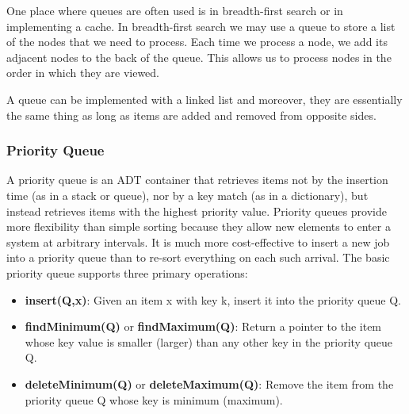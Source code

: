 \documentclass{article}
\begin{document}
    One place where queues are often used is in breadth-first search or in implementing a cache. In breadth-first search we may use a queue to store a list of the nodes that we need to process. Each time we process a node, we add its adjacent nodes to the back of the queue. This allows us to process nodes in the order in which they are viewed. 
    
    A queue can be implemented with a linked list and moreover, they are essentially the same thing as long as items are added and removed from opposite sides.
    
    \subsubsection{Priority Queue}
    A priority queue is an ADT container that retrieves items not by the insertion time (as in a stack or queue), nor by a key match (as in a dictionary), but instead retrieves items with the highest priority value. Priority queues provide more flexibility than simple sorting because they allow new elements to enter a system at arbitrary intervals. It is much more cost-effective to insert a new job into a priority queue than to re-sort everything on each such arrival. The basic priority queue supports three primary operations:
    \begin{itemize}
        \item \textbf{insert(Q,x)}: Given an item x with key k, insert it into the priority queue Q.
        \item \textbf{findMinimum(Q)} or \textbf{findMaximum(Q)}: Return a pointer to the item whose key value is smaller (larger) than any other key in the priority queue Q.
        \item \textbf{deleteMinimum(Q)} or \textbf{deleteMaximum(Q)}: Remove the item from the priority queue Q whose key is minimum (maximum).
    \end{itemize}
\end{document}
